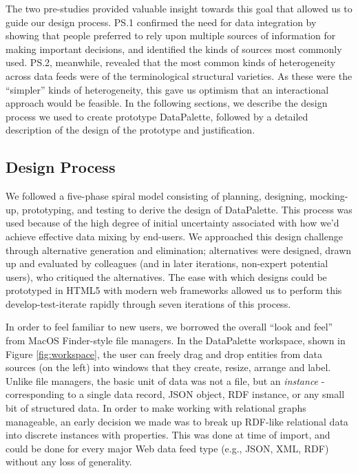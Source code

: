 \documentclass{sigchi}
\begin{document}
The two pre-studies provided valuable insight towards this goal that allowed us to guide our design process. PS.1 confirmed the need for data integration by showing that people preferred to rely upon multiple sources of information for making important decisions, and identified the kinds of sources most commonly used.  PS.2, meanwhile, revealed that the most common kinds of heterogeneity across data feeds were of the terminological structural varieties. As these were the ``simpler'' kinds of heterogeneity, this gave us optimism that an interactional approach would be feasible.  In the following sections, we describe the design process we used to create prototype DataPalette, followed by a detailed description of the design of the prototype and justification.

\subsection{Design Process}
We followed a five-phase spiral model consisting of planning, designing, mocking-up, prototyping, and testing to derive the design of DataPalette.  This process was used because of the high degree of initial uncertainty associated with how we'd achieve effective data mixing by end-users. We approached this design challenge through alternative generation and elimination; alternatives were designed, drawn up and evaluated by colleagues (and in later iterations, non-expert potential users), who critiqued the alternatives. The ease with which designs could be prototyped in HTML5 with modern web frameworks allowed us to perform this develop-test-iterate rapidly through seven iterations of this process.

In order to feel familiar to new users, we borrowed the overall  ``look and feel'' from MacOS Finder-style file managers.  In the DataPalette workspace, shown in Figure \ref{fig:workspace}, the user can freely drag and drop entities from data sources (on the left) into windows that they create, resize, arrange and label. Unlike file managers, the basic unit of data was not a file, but an \emph{instance} - corresponding to a single data record, JSON object, RDF instance, or any small bit of structured data. In order to make working with relational graphs manageable, an early decision we made was to break up RDF-like relational data into discrete instances with properties. This was done at time of import, and could be done for every major Web data feed type (e.g., JSON, XML, RDF) without any loss of generality.
\end{document}

